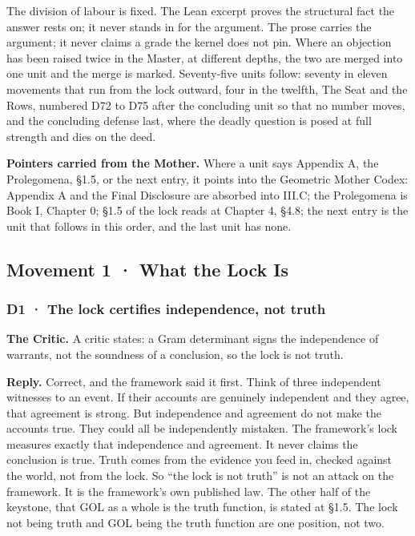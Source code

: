 \documentclass[10pt,twocolumn]{article}
\begin{document}
The division of labour is fixed. The Lean excerpt proves the structural
fact the answer rests on; it never stands in for the argument. The prose
carries the argument; it never claims a grade the kernel does not pin.
Where an objection has been raised twice in the Master, at different
depths, the two are merged into one unit and the merge is marked.
Seventy-five units follow: seventy in eleven movements that run from the
lock outward, four in the twelfth, The Seat and the Rows, numbered D72
to D75 after the concluding unit so that no number moves, and the
concluding defense last, where the deadly question is posed at full
strength and dies on the deed.

\textbf{Pointers carried from the Mother.} Where a unit says Appendix A,
the Prolegomena, §1.5, or the next entry, it points into the Geometric
Mother Codex: Appendix A and the Final Disclosure are absorbed into
III.C; the Prolegomena is Book I, Chapter 0; §1.5 of the lock reads at
Chapter 4, §4.8; the next entry is the unit that follows in this order,
and the last unit has none.

\hypertarget{movement-1-what-the-lock-is}{%
\subsection{Movement 1 · What the Lock
Is}\label{movement-1-what-the-lock-is}}

\hypertarget{d1-the-lock-certifies-independence-not-truth}{%
\subsubsection{D1 · The lock certifies independence, not
truth}\label{d1-the-lock-certifies-independence-not-truth}}

\textbf{The Critic.} A critic states: a Gram determinant signs the
independence of warrants, not the soundness of a conclusion, so the lock
is not truth.

\textbf{Reply.} Correct, and the framework said it first. Think of three
independent witnesses to an event. If their accounts are genuinely
independent and they agree, that agreement is strong. But independence
and agreement do not make the accounts true. They could all be
independently mistaken. The framework's lock measures exactly that
independence and agreement. It never claims the conclusion is true.
Truth comes from the evidence you feed in, checked against the world,
not from the lock. So ``the lock is not truth'' is not an attack on the
framework. It is the framework's own published law. The other half of
the keystone, that GOL as a whole is the truth function, is stated at
§1.5. The lock not being truth and GOL being the truth function are one
position, not two.
\end{document}
